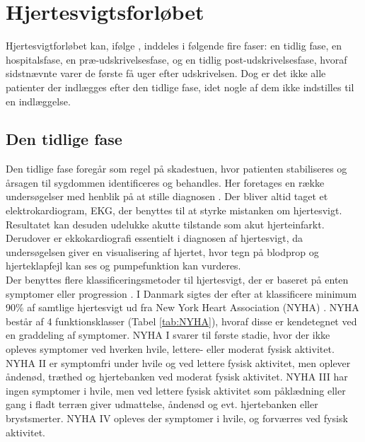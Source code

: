 \section{Hjertesvigtsforløbet}
Hjertesvigtforløbet kan, ifølge \citet{Gheorghiade2009}, inddeles i følgende fire faser: en tidlig fase, en hospitalsfase, en præ-udskrivelsesfase, og en tidlig post-udskrivelsesfase, hvoraf sidstnævnte varer de første få uger efter udskrivelsen. Dog er det ikke alle patienter der indlægges efter den tidlige fase, idet nogle af dem ikke indstilles til en indlæggelse.
\subsection{Den tidlige fase}\label{dentidligefase}
Den tidlige fase foregår som regel på skadestuen, hvor patienten stabiliseres og årsagen til sygdommen identificeres og behandles. Her foretages en række undersøgelser med henblik på at stille diagnosen \citep{heartfailure}. Der bliver altid taget et elektrokardiogram, EKG, der benyttes til at styrke mistanken om hjertesvigt. Resultatet kan desuden udelukke akutte tilstande som akut hjerteinfarkt. Derudover er ekkokardiografi essentielt i diagnosen af hjertesvigt, da undersøgelsen giver en visualisering af hjertet, hvor tegn på blodprop og hjerteklapfejl kan ses og pumpefunktion kan vurderes. \citep{heartfailure} \citep{DCS}\\
Der benyttes flere klassificeringsmetoder til hjertesvigt, der er baseret på enten symptomer eller progression \citep{heartfailure}. I Danmark sigtes der efter at klassificere minimum 90\% af samtlige hjertesvigt  ud fra New York Heart Association (NYHA) \citep{RKKP2017}. NYHA består af 4 funktionsklasser (Tabel \ref{tab:NYHA}), hvoraf disse er kendetegnet ved en graddeling af symptomer. NYHA I svarer til første stadie, hvor der ikke opleves symptomer ved hverken hvile, lettere- eller moderat fysisk aktivitet. NYHA II er symptomfri under hvile og ved lettere fysisk aktivitet, men oplever åndenød, træthed og hjertebanken ved moderat fysisk aktivitet. NYHA III har ingen symptomer i hvile, men ved lettere fysisk aktivitet som påklædning eller gang i fladt terræn giver udmattelse, åndenød og evt. hjertebanken eller brystsmerter. NYHA IV opleves der symptomer i hvile, og forværres ved fysisk aktivitet.\\

